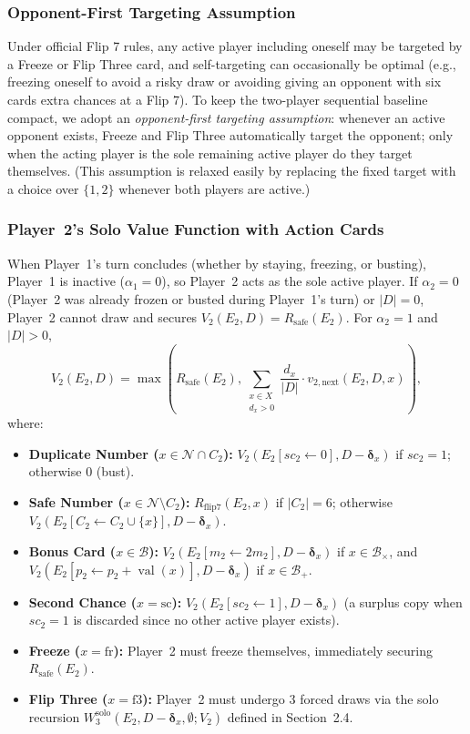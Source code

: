 \documentclass{article}
\theoremstyle{plain}
\theoremstyle{definition}
\theoremstyle{remark}
\DeclareMathOperator{\val}{val}
\begin{document}
\subsubsection{Opponent-First Targeting Assumption}
Under official Flip 7 rules, any active player including oneself may be targeted by a Freeze or Flip Three card, and self-targeting can occasionally be optimal (e.g., freezing oneself to avoid a risky draw or avoiding giving an opponent with six cards extra chances at a Flip 7). To keep the two-player sequential baseline compact, we adopt an \textit{opponent-first targeting assumption}: whenever an active opponent exists, Freeze and Flip Three automatically target the opponent; only when the acting player is the sole remaining active player do they target themselves. (This assumption is relaxed easily by replacing the fixed target with a choice over $\{1, 2\}$ whenever both players are active.)

\subsubsection{Player~2's Solo Value Function with Action Cards}
When Player~1's turn concludes (whether by staying, freezing, or busting), Player~1 is inactive ($\alpha_1 = 0$), so Player~2 acts as the sole active player. If $\alpha_2 = 0$ (Player~2 was already frozen or busted during Player~1's turn) or $|D| = 0$, Player~2 cannot draw and secures $V_2(E_2, D) = R_{\text{safe}}(E_2)$. For $\alpha_2 = 1$ and $|D| > 0$,
\[
    V_2(E_2, D) = \max \left( R_{\text{safe}}(E_2), \sum_{\substack{x \in X \\ d_x > 0}} \frac{d_x}{|D|} \cdot v_{2,\text{next}}(E_2, D, x) \right),
\]
where:
\begin{itemize}
    \item \textbf{Duplicate Number ($x \in \mathcal{N} \cap C_2$):} $V_2(E_2[sc_2 \leftarrow 0], D - \boldsymbol{\delta}_x)$ if $sc_2 = 1$; otherwise $0$ (bust).
    \item \textbf{Safe Number ($x \in \mathcal{N} \setminus C_2$):} $R_{\text{flip7}}(E_2, x)$ if $|C_2| = 6$; otherwise $V_2(E_2[C_2 \leftarrow C_2 \cup \{x\}], D - \boldsymbol{\delta}_x)$.
    \item \textbf{Bonus Card ($x \in \mathcal{B}$):} $V_2(E_2[m_2 \leftarrow 2m_2], D - \boldsymbol{\delta}_x)$ if $x \in \mathcal{B}_{\times}$, and $V_2(E_2[p_2 \leftarrow p_2 + \val(x)], D - \boldsymbol{\delta}_x)$ if $x \in \mathcal{B}_{+}$.
    \item \textbf{Second Chance ($x = \text{sc}$):} $V_2(E_2[sc_2 \leftarrow 1], D - \boldsymbol{\delta}_x)$ (a surplus copy when $sc_2 = 1$ is discarded since no other active player exists).
    \item \textbf{Freeze ($x = \text{fr}$):} Player~2 must freeze themselves, immediately securing $R_{\text{safe}}(E_2)$.
    \item \textbf{Flip Three ($x = \text{f3}$):} Player~2 must undergo $3$ forced draws via the solo recursion $W_3^{\text{solo}}(E_2, D - \boldsymbol{\delta}_x, \emptyset; V_2)$ defined in Section~2.4.
\end{itemize}
\end{document}
